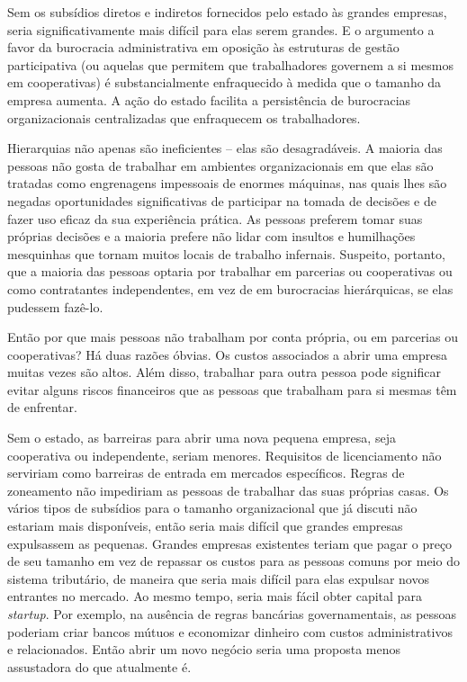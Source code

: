 Sem os subsídios diretos e indiretos fornecidos pelo estado às grandes empresas, seria significativamente mais difícil para elas serem grandes. E o argumento a favor da burocracia administrativa em oposição às estruturas de gestão participativa (ou aquelas que permitem que trabalhadores governem a si mesmos em cooperativas) é substancialmente enfraquecido à medida que o tamanho da empresa aumenta. A ação do estado facilita a persistência de burocracias organizacionais centralizadas que enfraquecem os trabalhadores.

Hierarquias não apenas são ineficientes -- elas são desagradáveis. A maioria das pessoas não gosta de trabalhar em ambientes organizacionais em que elas são tratadas como engrenagens impessoais de enormes máquinas, nas quais lhes são negadas oportunidades significativas de participar na tomada de decisões e de fazer uso eficaz da sua experiência prática. As pessoas preferem tomar suas próprias decisões e a maioria prefere não lidar com insultos e humilhações mesquinhas que tornam muitos locais de trabalho infernais. Suspeito, portanto, que a maioria das pessoas optaria por trabalhar em parcerias ou cooperativas ou como contratantes independentes, em vez de em burocracias hierárquicas, se elas pudessem fazê-lo.

Então por que mais pessoas não trabalham por conta própria, ou em parcerias ou cooperativas? Há duas razões óbvias. Os custos associados a abrir uma empresa muitas vezes são altos. Além disso, trabalhar para outra pessoa pode significar evitar alguns riscos financeiros que as pessoas que trabalham para si mesmas têm de enfrentar.

Sem o estado, as barreiras para abrir uma nova pequena empresa, seja cooperativa ou independente, seriam menores. Requisitos de licenciamento não serviriam como barreiras de entrada em mercados específicos. Regras de zoneamento não impediriam as pessoas de trabalhar das suas próprias casas. Os vários tipos de subsídios para o tamanho organizacional que já discuti não estariam mais disponíveis, então seria mais difícil que grandes empresas expulsassem as pequenas. Grandes empresas existentes teriam que pagar o preço de seu tamanho em vez de repassar os custos para as pessoas comuns por meio do sistema tributário, de maneira que seria mais difícil para elas expulsar novos entrantes no mercado. Ao mesmo tempo, seria mais fácil obter capital para \emph{startup}. Por exemplo, na ausência de regras bancárias governamentais, as pessoas poderiam criar bancos mútuos e economizar dinheiro com custos administrativos e relacionados. Então abrir um novo negócio seria uma proposta menos assustadora do que atualmente é.

